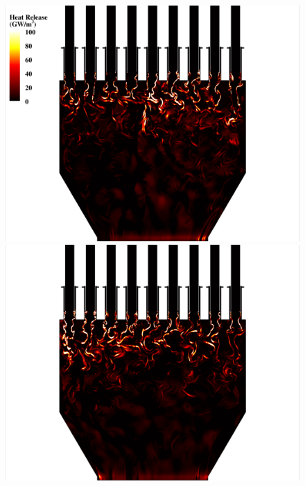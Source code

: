 \begin{figure}
	\begin{minipage}{0.49\linewidth}
		\includegraphics[width=0.99\linewidth,trim={0.5em 0em 6cm 0em},clip]{Chapters/HPROMResults/Images/nineElem/example_snaps/example_heat_z.png}
	\end{minipage}
	\begin{minipage}{0.49\linewidth}
		\includegraphics[width=0.99\linewidth,trim={6cm 0em 0.5em 0em},clip]{Chapters/HPROMResults/Images/nineElem/example_snaps/example_heat_z_216000.png}
	\end{minipage}


\end{figure}
